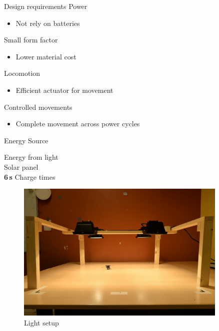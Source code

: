 \documentclass{beamer}
\begin{document}
\begin{frame}{Design requirements}
	Power \\
	\begin{itemize}
		\item Not rely on batteries
	\end{itemize}
	Small form factor \\
	\begin{itemize}
		\item Lower material cost
	\end{itemize}
    Locomotion \\
    \begin{itemize}
    	\item Efficient actuator for movement
    \end{itemize}
    Controlled movements \\
    \begin{itemize}
    	\item Complete movement across power cycles
    \end{itemize}
\end{frame}

\begin{frame}{Energy Source}
	\vspace{1em}
	\begin{minipage}{0.45\textwidth}
		Energy from light \\
		
		Solar panel \\
		
		\textbf{6\,s} Charge times
		
	\end{minipage}
	\begin{minipage}{0.54\textwidth}\raggedleft
		\begin{figure}
			\includegraphics[width=0.9\textwidth]{pics/light_setup.jpg}
			\caption*{Light setup}
		\end{figure}
	\end{minipage}
\end{frame}
\end{document}
